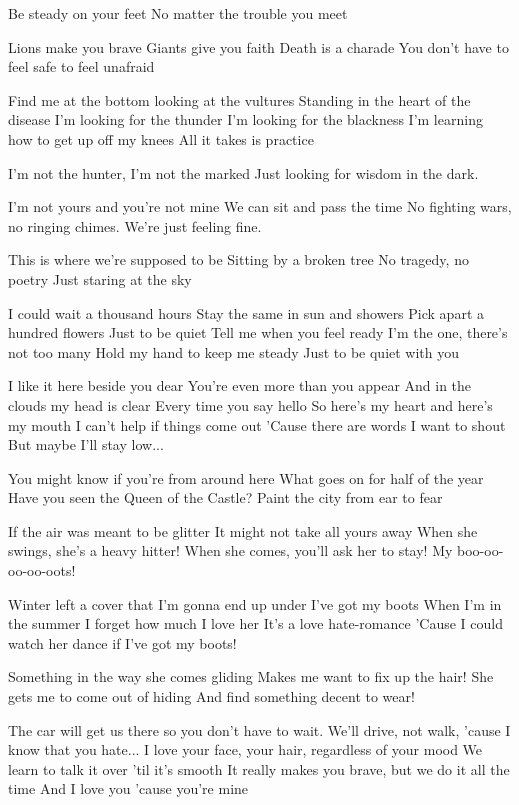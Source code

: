 Be steady on your feet
No matter the trouble you meet

Lions make you brave
Giants give you faith
Death is a charade
You don't have to feel safe to feel unafraid

Find me at the bottom looking at the vultures
Standing in the heart of the disease
I'm looking for the thunder
I'm looking for the blackness
I'm learning how to get up off my knees
All it takes is practice

I'm not the hunter, I'm not the marked
Just looking for wisdom in the dark.


I'm not yours and you're not mine
We can sit and pass the time
No fighting wars, no ringing chimes.
We're just feeling fine.

This is where we're supposed to be
Sitting by a broken tree
No tragedy, no poetry
Just staring at the sky

I could wait a thousand hours
Stay the same in sun and showers
Pick apart a hundred flowers
Just to be quiet
Tell me when you feel ready
I'm the one, there's not too many
Hold my hand to keep me steady
Just to be quiet with you

I like it here beside you dear
You're even more than you appear
And in the clouds my head is clear
Every time you say hello
So here's my heart and here's my mouth
I can't help if things come out
'Cause there are words I want to shout
But maybe I'll stay low...


You might know if you're from around here
What goes on for half of the year
Have you seen the Queen of the Castle?
Paint the city from ear to fear

If the air was meant to be glitter
It might not take all yours away
When she swings, she's a heavy hitter!
When she comes, you'll ask her to stay!
My boo-oo-oo-oo-oots!

Winter left a cover that I'm gonna end up under
I've got my boots
When I'm in the summer I forget how much I love her
It's a love hate-romance
'Cause I could watch her dance if I've got my boots!

Something in the way she comes gliding
Makes me want to fix up the hair!
She gets me to come out of hiding
And find something decent to wear!


The car will get us there so you don't have to wait.
We'll drive, not walk, 'cause I know that you hate...
I love your face, your hair, regardless of your mood
We learn to talk it over 'til it's smooth
It really makes you brave, but we do it all the time
And I love you 'cause you're mine

